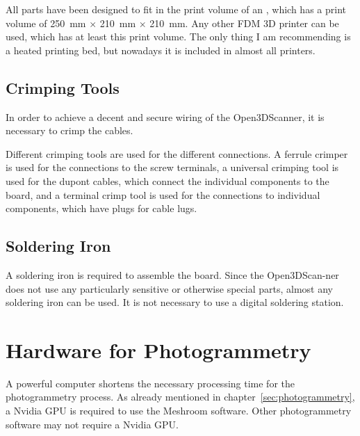 All parts have been designed to fit in the print volume of an , which has a print volume of \SI{250}{\milli\meter} $\times$ \SI{210}{\milli\meter} $\times$ \SI{210}{\milli\meter}. Any other FDM 3D printer can be used, which has at least this print volume. The only thing I am recommending is a heated printing bed, but nowadays it is included in almost all printers.%

\subsection{Crimping Tools}%
In order to achieve a decent and secure wiring of the Open3DScanner, it is necessary to crimp the cables.%

Different crimping tools are used for the different connections. A ferrule crimper is used for the connections to the screw terminals, a universal crimping tool is used for the dupont cables, which connect the individual components to the board, and a terminal crimp tool is used for the connections to individual components, which have plugs for cable lugs.%

\subsection{Soldering Iron}%
A soldering iron is required to assemble the board. Since the Open3DScan-ner does not use any particularly sensitive or otherwise special parts, almost any soldering iron can be used. It is not necessary to use a digital soldering station.%

\section{Hardware for Photogrammetry}%
A powerful computer shortens the necessary processing time for the photogrammetry process. As already mentioned in chapter~\ref{sec:photogrammetry}, a Nvidia GPU is required to use the Meshroom software. Other photogrammetry software may not require a Nvidia GPU.%

